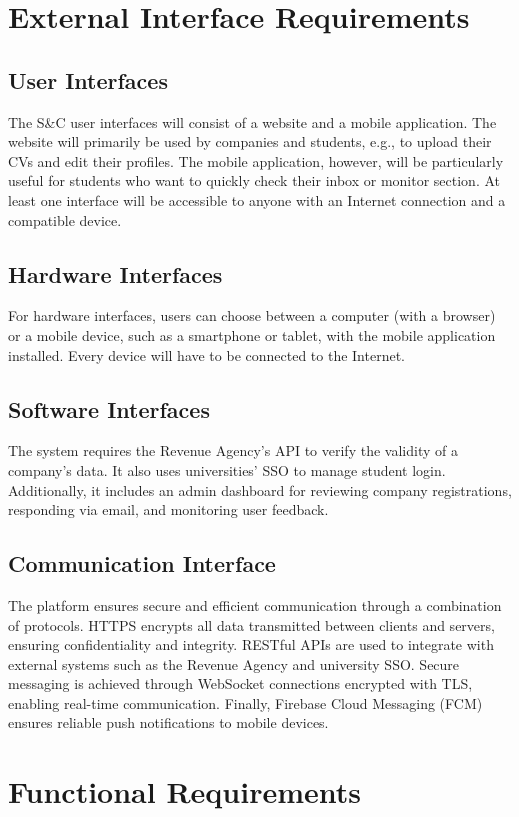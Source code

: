 \section{External Interface Requirements}
\subsection{User Interfaces}
The S\&C user interfaces will consist of a website and a mobile application. The website will primarily be used by companies and students, e.g., to upload their CVs and edit their profiles. The mobile application, however, will be particularly useful for students who want to quickly check their inbox or monitor section. At least one interface will be accessible to anyone with an Internet connection and a compatible device.
\subsection{Hardware Interfaces}
For hardware interfaces, users can choose between a computer (with a browser) or a mobile device, such as a smartphone or tablet, with the mobile application installed. Every device will have to be connected to the Internet.
\subsection{Software Interfaces}
The system requires the Revenue Agency's API to verify the validity of a company's data. It also uses universities' SSO to manage student login. Additionally, it includes an admin dashboard for reviewing company registrations, responding via email, and monitoring user feedback.
\subsection{Communication Interface}
The platform ensures secure and efficient communication through a combination of protocols. HTTPS encrypts all data transmitted between clients and servers, ensuring confidentiality and integrity. RESTful APIs are used to integrate with external systems such as the Revenue Agency and university SSO. Secure messaging is achieved through WebSocket connections encrypted with TLS, enabling real-time communication. Finally, Firebase Cloud Messaging (FCM) ensures reliable push notifications to mobile devices.
\section{Functional Requirements}

